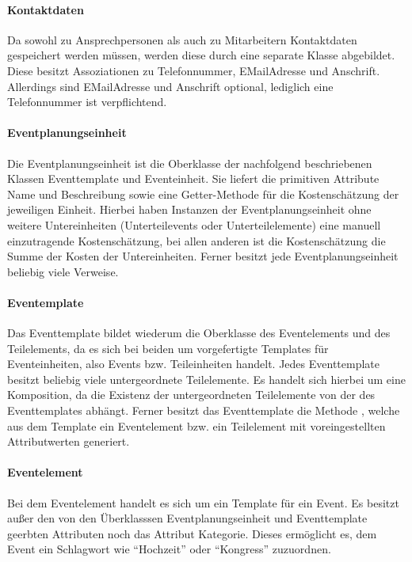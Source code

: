 \paragraph{Kontaktdaten}
Da sowohl zu Ansprechpersonen als auch zu Mitarbeitern Kontaktdaten gespeichert werden müssen, werden diese durch eine separate Klasse abgebildet. Diese besitzt Assoziationen zu Telefonnummer, EMailAdresse und Anschrift. Allerdings sind EMailAdresse und Anschrift optional, lediglich eine Telefonnummer ist verpflichtend.

\paragraph{Eventplanungseinheit}
Die Eventplanungseinheit ist die Oberklasse der nachfolgend beschriebenen Klassen Eventtemplate und Eventeinheit. Sie liefert die primitiven Attribute Name und Beschreibung sowie eine Getter-Methode für die Kostenschätzung der jeweiligen Einheit. Hierbei haben Instanzen der Eventplanungseinheit ohne weitere Untereinheiten (Unterteilevents oder Unterteilelemente) eine manuell einzutragende Kostenschätzung, bei allen anderen ist die Kostenschätzung die Summe der Kosten der Untereinheiten. Ferner besitzt jede Eventplanungseinheit beliebig viele Verweise.

\paragraph{Eventemplate}
Das Eventtemplate bildet wiederum die Oberklasse des Eventelements und des Teilelements, da es sich bei beiden um vorgefertigte Templates für Eventeinheiten, also Events bzw. Teileinheiten handelt. Jedes Eventtemplate besitzt beliebig viele untergeordnete Teilelemente. Es handelt sich hierbei um eine Komposition, da die Existenz der untergeordneten Teilelemente von der des Eventtemplates abhängt. Ferner besitzt das Eventtemplate die Methode , welche aus dem Template ein Eventelement bzw. ein Teilelement mit voreingestellten Attributwerten generiert.

\paragraph{Eventelement}
Bei dem Eventelement handelt es sich um ein Template für ein Event. Es besitzt außer den von den Überklasssen Eventplanungseinheit und Eventtemplate geerbten Attributen noch das Attribut Kategorie. Dieses ermöglicht es, dem Event ein Schlagwort wie \enquote{Hochzeit} oder \enquote{Kongress} zuzuordnen.

